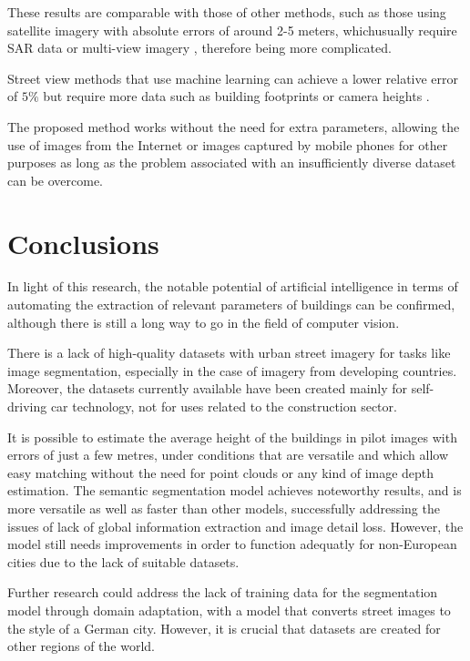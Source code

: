 \documentclass[journal,article,submit,pdftex,moreauthors]{Definitions/mdpi}
\begin{document}
These results are comparable with those of other methods, such as those using satellite imagery with absolute errors of around 2-5 meters, whichusually require SAR data \cite{Frantz2021National-scaleSeries} or multi-view imagery \citep{Cao2021ACities,Xiao2012BuildingDetection}, therefore being more complicated.

Street view methods that use machine learning can achieve a lower relative error of \(5\%\) but require more data such as building footprints \citep{AlaAnProjects,Zhao2019CBHE:Images} or camera heights \cite{Yan2022EstimationNetworks}.

The proposed method works without the need for extra parameters, allowing the use of images from the Internet or images captured by mobile phones for other purposes as long as the problem associated with an insufficiently diverse dataset can be overcome.

\section{Conclusions}

In light of this research, the notable potential of artificial intelligence in terms of automating the extraction of relevant parameters of buildings can be confirmed, although there is still a long way to go in the field of computer vision. 

There is a lack of high-quality datasets with urban street imagery for tasks like image segmentation, especially in the case of imagery from developing countries. Moreover, the datasets currently available have been created mainly for self-driving car technology, not for uses related to the construction sector. 

It is possible to estimate the average height of the buildings in pilot images with errors of just a few metres, under conditions that are versatile and which allow easy matching without the need for point clouds or any kind of image depth estimation. The semantic segmentation model achieves noteworthy results, and is more versatile as well as faster than other models, successfully addressing the issues of lack of global information extraction and image detail loss. However, the model still needs improvements in order to function adequatly for non-European cities due to the lack of suitable datasets.

Further research could address the lack of training data for the segmentation model through domain adaptation, with a model that converts street images to the style of a German city. However, it is crucial that datasets are created for other regions of the world. 
\end{document}
